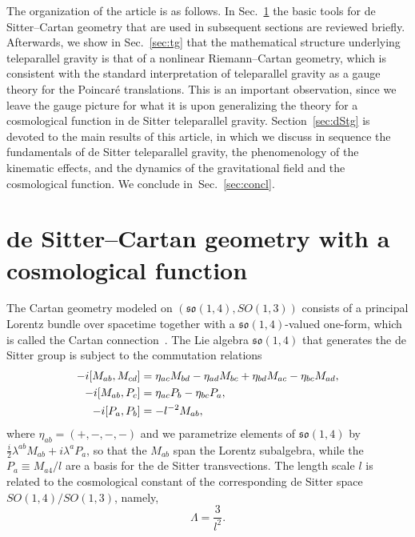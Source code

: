 \documentclass[%
5p,
times,
sort&compress
]{elsarticle}
\def\mf{\mathfrak}
\begin{document}
The organization of the article is as follows. In 
Sec.~\ref{sec:dSCgeo} the basic tools for de Sitter--Cartan 
geometry that are used in subsequent sections are reviewed 
briefly. Afterwards, we show in Sec.~\ref{sec:tg} that the 
mathematical structure underlying teleparallel gravity is that of 
a nonlinear Riemann--Cartan geometry, which is consistent with 
the standard interpretation of teleparallel gravity as a gauge 
theory for the Poincar\'e translations. This is an important 
observation, since we leave the gauge picture for what it is upon 
generalizing the theory for a cosmological function in de Sitter 
teleparallel gravity. Section~\ref{sec:dStg} is devoted to the 
main results of this article, in which we discuss in sequence the 
fundamentals of de Sitter teleparallel gravity, the phenomenology 
of the kinematic effects, and the dynamics of the gravitational 
field and the cosmological function. We conclude 
in~Sec.~\ref{sec:concl}.

\section{de Sitter--Cartan geometry with a cosmological function}
\label{sec:dSCgeo}

The Cartan geometry modeled on $(\mf{so}(1,4),SO(1,3))$ 
consists of a principal Lorentz bundle over spacetime together 
with a $\mf{so}(1,4)$-valued one-form, which is called the 
Cartan connection~\cite{Alekseevsky:1995cc, sharpe1997diff_geo, 
  Wise:2009fu, Wise:2010sm}. The Lie algebra $\mf{so}(1,4)$ 
that generates the de Sitter group is subject to the commutation 
relations
\begin{align}
  -i[M_{ab},M_{cd}] &= \eta_{ac}M_{bd} - \eta_{ad}M_{bc} 
  + \eta_{bd}M_{ac} - \eta_{bc}M_{ad},
  \notag\\
  -i[M_{ab},P_c] &= \eta_{ac}P_b- \eta_{bc}P_a,
  \notag\\
  -i[P_a,P_b] &= -l^{-2}M_{ab},
  \label{eq:comm_relations_so(1,4)}
\end{align}
where $\eta_{ab} = (+, - , -, -)$ and we parametrize elements of 
$\mf{so}(1,4)$ by $\tfrac{i}{2} \lambda^{ab} M_{ab} + i \lambda^a 
P_a$, so that the $M_{ab}$ span the Lorentz subalgebra, while the 
$P_a \equiv M_{a4}/l$ are a basis for the de Sitter 
transvections. The length scale $l$ is related to the 
cosmological constant of the corresponding de Sitter space 
$SO(1,4)/SO(1,3)$, namely,~\cite{Wise:2010sm}
\begin{equation}
  \label{eq:rel.Ll}
  \Lambda = \frac{3}{l^2}.
\end{equation}
\end{document}
